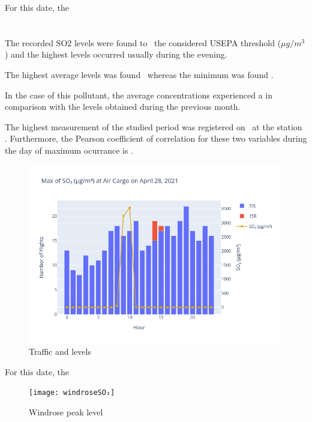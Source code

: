 \documentclass[12pt, oneside]{book}
\begin{document}
For this date, the \windOthree


\section{}

The recorded SO2 levels were found to \tresholdSOtwo\ the considered USEPA threshold (\limitSOtwo $\mu g/m^3$) and the highest levels occurred usually during the evening.

The highest average  levels was found \maxDailySOtwo\ whereas the minimum was found \minDailySOtwo .

In the case of this pollutant, the average concentrations experienced a \monthChangeSOtwo in comparison with the levels obtained during the previous month.

The highest measurement of the studied period was registered  on \dayMaxSOtwo \ at the station \stationMaxSOtwo . 
Furthermore, the Pearson coefficient of correlation for these two variables during the day of maximum ocurrance is \correlSOtwo .  

{\begin{figure}[H]
\centering
\includegraphics[width=0.98\textwidth,keepaspectratio]{image13}
\caption{Traffic and  levels}\label{image13}
\end{figure}}{}

For this date, the \windSOtwo

{\begin{figure}[H]
\centering
	\texttt{[image: windroseSO₂]}
\caption{Windrose  peak level}\label{windroseSO2}
\end{figure}}{}
\end{document}
